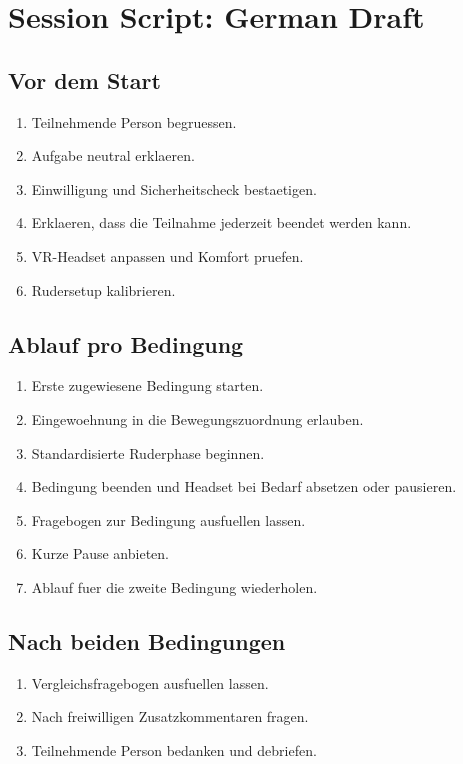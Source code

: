 \section{Session Script: German Draft}
\label{app:study_materials_session_script_german}


\subsection*{Vor dem Start}

\begin{enumerate}
    \item Teilnehmende Person begruessen.
    \item Aufgabe neutral erklaeren.
    \item Einwilligung und Sicherheitscheck bestaetigen.
    \item Erklaeren, dass die Teilnahme jederzeit beendet werden kann.
    \item VR-Headset anpassen und Komfort pruefen.
    \item Rudersetup kalibrieren.
\end{enumerate}

\subsection*{Ablauf pro Bedingung}

\begin{enumerate}
    \item Erste zugewiesene Bedingung starten.
    \item Eingewoehnung in die Bewegungszuordnung erlauben.
    \item Standardisierte Ruderphase beginnen.
    \item Bedingung beenden und Headset bei Bedarf absetzen oder pausieren.
    \item Fragebogen zur Bedingung ausfuellen lassen.
    \item Kurze Pause anbieten.
    \item Ablauf fuer die zweite Bedingung wiederholen.
\end{enumerate}

\subsection*{Nach beiden Bedingungen}

\begin{enumerate}
    \item Vergleichsfragebogen ausfuellen lassen.
    \item Nach freiwilligen Zusatzkommentaren fragen.
    \item Teilnehmende Person bedanken und debriefen.
\end{enumerate}


